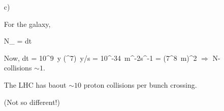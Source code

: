 {\begin{itemize}
{So
\be
{} \sim \left(\right)^{} \sim 10^{-7}\ m
\ee

\be
{} \sim {} \sim 10^8
\ee
Which is quite close !
}
\item[c)] {
For the galaxy,

\be
N_ = \int dt  \times \sigma
\ee

Now, 
\be
\int dt = 10^9\ y \times (^7)\ y/s
\ee
\be
{} = 10^{-34}\ m^{-2}s^{-1}
\ee
\be
\sigma = \pi (7^8\ m)^2
\ee
$\Rightarrow$ N-collisions $\sim 1$.

The LHC has baout $\sim 10$ proton collisions per bunch crossing. 

(Not so different!)

}
\end{itemize}

}

